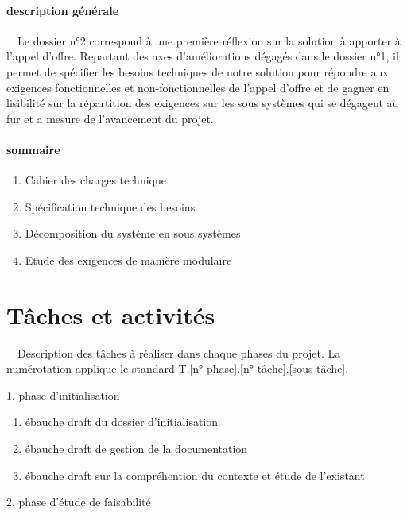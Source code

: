\documentclass{mise_en_page}
\begin{document}
\paragraph[description générale]{description générale}
\ \ Le dossier n°2 correspond à une première réflexion sur la solution à
apporter à l’appel d’offre. Repartant des axes d’améliorations dégagés
dans le dossier n°1, il permet de spécifier les besoins techniques de
notre solution pour répondre aux exigences fonctionnelles et
non-fonctionnelles  de l’appel d’offre et de gagner en lisibilité sur
la répartition des exigences sur les sous systèmes qui se dégagent au
fur et a mesure de l’avancement du projet.

\paragraph[sommaire]{sommaire}
\begin{enumerate}
\item Cahier des charges technique
\item Spécification technique des besoins
\item Décomposition du système en sous systèmes
\item Etude des exigences de manière modulaire
\end{enumerate}

\section{Tâches et activités}
\ \ Description des tâches à réaliser dans chaque phases du projet. La
numérotation applique le standard T.[n° phase].[n° tâche].[sous-tâche].

1. phase d’initialisation

\begin{enumerate}
\item ébauche draft du dossier d’initialisation
\item ébauche draft de gestion de la documentation
\item ébauche draft sur la compréhention du contexte et étude de
l’existant
\end{enumerate}
2. phase d’étude de faisabilité
\end{document}
